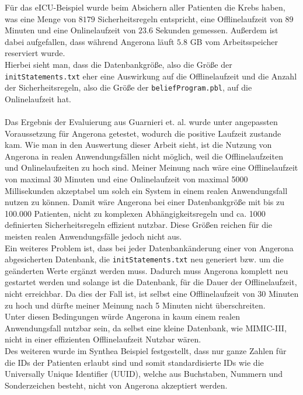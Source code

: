 \documentclass[german,version-2020-11]{uzl-thesis}
\begin{document}
Für das eICU-Beispiel wurde beim Absichern aller Patienten die Krebs haben, was eine Menge von $8179$ Sicherheitsregeln entspricht, eine Offlinelaufzeit von $89$ Minuten und eine Onlinelaufzeit von $23.6$ Sekunden gemessen. Außerdem ist dabei aufgefallen, dass während Angerona läuft $5.8$ GB vom Arbeitsspeicher reserviert wurde. \\ 
Hierbei sieht man, dass die Datenbankgröße, also die Größe der \texttt{initStatements.txt} eher eine Auswirkung auf die Offlinelaufzeit und die Anzahl der Sicherheitsregeln, also die Größe der \texttt{beliefProgram.pbl}, auf die Onlinelaufzeit hat. \\ \\ 
Das Ergebnis der Evaluierung aus Guarnieri et. al. \cite{guarnieri2017securing} wurde unter angepassten Voraussetzung für Angerona getestet, wodurch die positive Laufzeit zustande kam. Wie man in den Auswertung dieser Arbeit sieht, ist die Nutzung von Angerona in realen Anwendungsfällen nicht möglich, weil die Offlinelaufzeiten und Onlinelaufzeiten zu hoch sind. Meiner Meinung nach wäre eine Offlinelaufzeit von maximal 30 Minuten und eine Onlinelaufzeit von maximal 5000 Millisekunden akzeptabel um solch ein System in einem realen Anwendungsfall nutzen zu können. Damit wäre Angerona bei einer Datenbankgröße mit bis zu 100.000 Patienten, nicht zu komplexen Abhängigkeitsregeln und ca. 1000 definierten Sicherheitsregeln effizient nutzbar. Diese Größen reichen für die meisten realen Anwendungsfälle jedoch nicht aus. \\ 
Ein weiteres Problem ist, dass bei jeder Datenbankänderung einer von Angerona abgesicherten Datenbank, die \texttt{initStatements.txt} neu generiert bzw. um die geänderten Werte ergänzt werden muss. Dadurch muss Angerona komplett neu gestartet werden und solange ist die Datenbank, für die Dauer der Offlinelaufzeit, nicht erreichbar. Da dies der Fall ist, ist selbst eine Offlinelaufzeit von 30 Minuten zu hoch und dürfte meiner Meinung nach 5 Minuten nicht überschreiten. \\ Unter diesen Bedingungen würde Angerona in kaum einem realen Anwendungsfall nutzbar sein, da selbst eine kleine Datenbank, wie MIMIC-III, nicht in einer effizienten Offlinelaufzeit Nutzbar wären. \\ 
Des weiteren wurde im Synthea Beispiel festgestellt, dass nur ganze Zahlen für die IDs der Patienten erlaubt sind und somit standardisierte IDs wie die  Universally Unique Identifier (UUID), welche aus Buchstaben, Nummern und Sonderzeichen besteht, nicht von Angerona akzeptiert werden. \\ 
\end{document}
